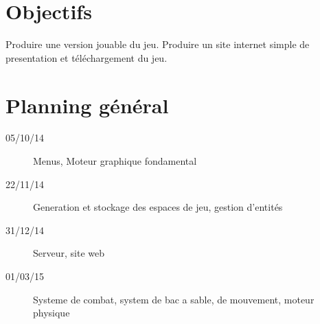 \documentclass{article}
\begin{document}
\section{Objectifs}
Produire une version jouable du jeu.
Produire un site internet simple de presentation et téléchargement du jeu.
\section{Planning général}
\begin{description}
\item[05/10/14] Menus, Moteur graphique fondamental
\item[22/11/14] Generation et stockage des espaces de jeu, gestion d'entités
\item[31/12/14] Serveur, site web
\item[01/03/15] Systeme de combat, system de bac a sable, de mouvement, moteur physique
\end{description}
\end{document}
